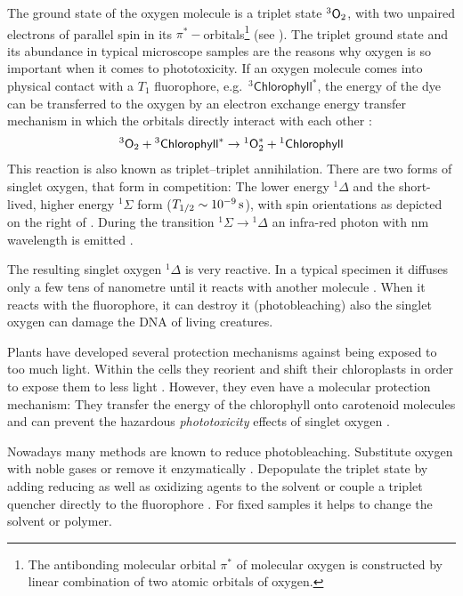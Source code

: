 The ground state of the oxygen molecule is a triplet state ${}^3\textsf{O}_2$,   
with two unpaired electrons of parallel spin in its
$\pi^*-$orbitals\footnote{The antibonding molecular orbital $\pi^*$ of
  molecular oxygen is constructed by linear combination of two atomic
  orbitals of oxygen.}  (see ). The triplet ground
state and its abundance in typical microscope samples are the reasons
why oxygen is so important when it comes to phototoxicity. If an
oxygen molecule comes into physical contact with a $T_1$ fluorophore,
e.g.\ ${}^3\textsf{Chlorophyll}^*$, the energy of the dye can be
transferred to the oxygen by an electron exchange energy transfer
mechanism in which the orbitals directly interact with each other
\citetext{\citealp[p.~438]{Haken2006} and \citealp{Linde2011a}}:
\begin{align}
  {}^3\textsf{O}_2 + {}^3\textsf{Chlorophyll}^* \rightarrow
  {}^1\textsf{O}^*_2+{}^1\textsf{Chlorophyll}
\end{align}
This reaction is also known as triplet--triplet annihilation.  There
are two forms of singlet oxygen, that form in competition: The lower
energy ${}^1\Delta$ and the short-lived, higher energy ${}^1\Sigma$
form ($T_{1/2}\sim\unit[10^{-9}]{s}$), with spin orientations as
depicted on the right of . During the transition
${}^1\Sigma\rightarrow{}^1\Delta$ an infra-red photon with
\unit[1268]{nm} wavelength is emitted \citep[p.~20]{Linde2011a}.

The resulting singlet oxygen ${}^1\Delta$ is very reactive. In a       
typical specimen it diffuses only a few tens of nanometre until it
reacts with another molecule \citep{Sauer2011}. When it reacts with
the fluorophore, it can destroy it (photobleaching) also the singlet
oxygen can damage the DNA of living creatures. 

Plants have developed several protection mechanisms against being      
exposed to too much light. Within the cells they reorient and shift
their chloroplasts in order to expose them to less light
\citep{Reshak2009}.  However, they even have a molecular protection
mechanism: They transfer the energy of the chlorophyll onto carotenoid
molecules and can prevent the hazardous \emph{phototoxicity} effects
of singlet oxygen \citep{Krieger-Liszkay2005}.

Nowadays many methods are known to reduce photobleaching. Substitute  
oxygen with noble gases or remove it enzymatically
\citep[p.~89]{Sauer2011}. Depopulate the triplet state by adding
reducing as well as oxidizing agents to the solvent
\citep{Vogelsang2008} or couple a triplet quencher directly to the
fluorophore \citep[p.~19]{Sauer2011}. For fixed samples it helps to
change the solvent or polymer.
 
